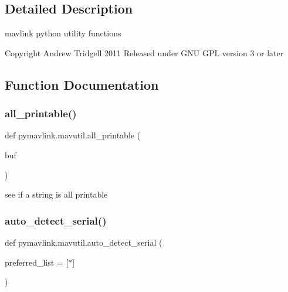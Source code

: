 \subsection{Detailed Description}
\begin{DoxyVerb}mavlink python utility functions

Copyright Andrew Tridgell 2011
Released under GNU GPL version 3 or later
\end{DoxyVerb}
 

\subsection{Function Documentation}
\mbox{\label{namespacepymavlink_1_1mavutil_ad8151d7419cca7f25a52185b8844c09e}} 
\subsubsection{\texorpdfstring{all\+\_\+printable()}{all\_printable()}}
{\footnotesize\ttfamily def pymavlink.\+mavutil.\+all\+\_\+printable (\begin{DoxyParamCaption}\item[{}]{buf }\end{DoxyParamCaption})}

\begin{DoxyVerb}see if a string is all printable\end{DoxyVerb}
 \mbox{\label{namespacepymavlink_1_1mavutil_a256e344d1870c0a938cac5b21d3003be}} 
\subsubsection{\texorpdfstring{auto\+\_\+detect\+\_\+serial()}{auto\_detect\_serial()}}
{\footnotesize\ttfamily def pymavlink.\+mavutil.\+auto\+\_\+detect\+\_\+serial (\begin{DoxyParamCaption}\item[{}]{preferred\+\_\+list = {\ttfamily \mbox{[}\textquotesingle{}$\ast$\textquotesingle{}\mbox{]}} }\end{DoxyParamCaption})}

